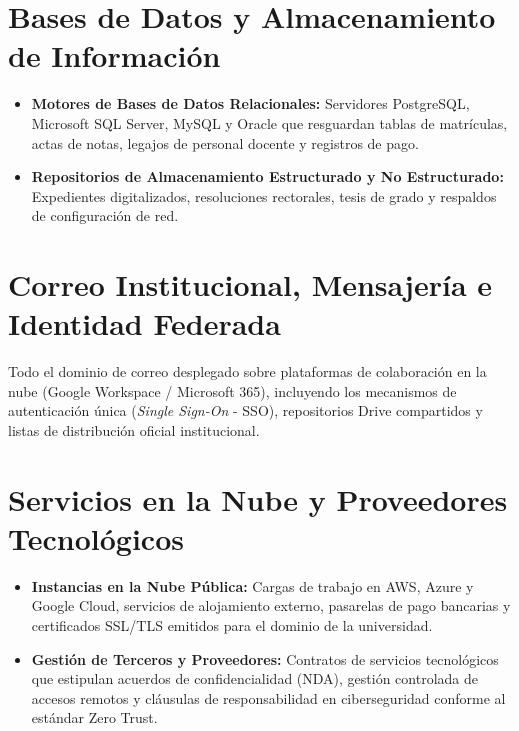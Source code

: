 \section{Bases de Datos y Almacenamiento de Información}

\begin{itemize}[itemsep=3pt,topsep=2pt,parsep=0pt]
    \item \textbf{Motores de Bases de Datos Relacionales:} Servidores PostgreSQL, Microsoft SQL Server, MySQL y Oracle que resguardan tablas de matrículas, actas de notas, legajos de personal docente y registros de pago.

    \item \textbf{Repositorios de Almacenamiento Estructurado y No Estructurado:} Expedientes digitalizados, resoluciones rectorales, tesis de grado y respaldos de configuración de red.
\end{itemize}

\section{Correo Institucional, Mensajería e Identidad Federada}

Todo el dominio de correo  desplegado sobre plataformas de colaboración en la nube (Google Workspace / Microsoft 365), incluyendo los mecanismos de autenticación única (\textit{Single Sign-On} - SSO), repositorios Drive compartidos y listas de distribución oficial institucional.

\section{Servicios en la Nube y Proveedores Tecnológicos}

\begin{itemize}[itemsep=3pt,topsep=2pt,parsep=0pt]
    \item \textbf{Instancias en la Nube Pública:} Cargas de trabajo en AWS, Azure y Google Cloud, servicios de alojamiento externo, pasarelas de pago bancarias y certificados SSL/TLS emitidos para el dominio de la universidad.

    \item \textbf{Gestión de Terceros y Proveedores:} Contratos de servicios tecnológicos que estipulan acuerdos de confidencialidad (NDA), gestión controlada de accesos remotos y cláusulas de responsabilidad en ciberseguridad conforme al estándar Zero Trust.
\end{itemize}
